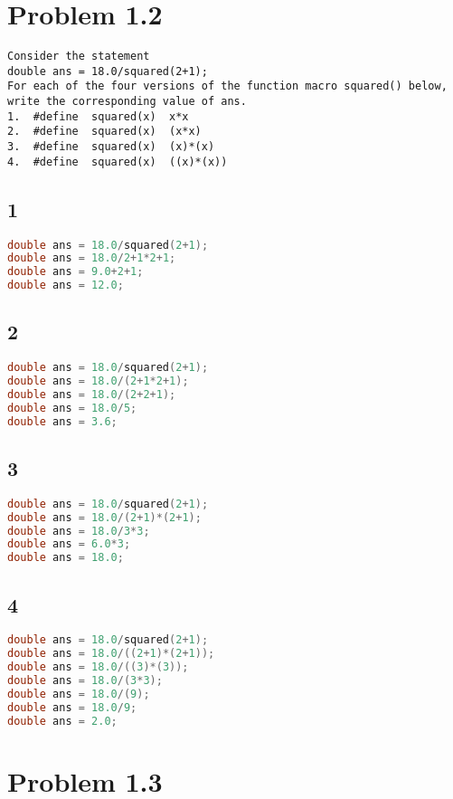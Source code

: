 \documentclass[12pt]{article}
\begin{document}
\section*{Problem 1.2}
\begin{verbatim}
Consider the statement
double ans = 18.0/squared(2+1);
For each of the four versions of the function macro squared() below, 
write the corresponding value of ans.
1.  #define  squared(x)  x*x
2.  #define  squared(x)  (x*x)
3.  #define  squared(x)  (x)*(x)
4.  #define  squared(x)  ((x)*(x))
\end{verbatim}

\subsection*{1}
\begin{lstlisting}[frame=single, language=C]
double ans = 18.0/squared(2+1);
double ans = 18.0/2+1*2+1;
double ans = 9.0+2+1;
double ans = 12.0;
\end{lstlisting}

\subsection*{2}
\begin{lstlisting}[frame=single, language=C]
double ans = 18.0/squared(2+1);
double ans = 18.0/(2+1*2+1);
double ans = 18.0/(2+2+1);
double ans = 18.0/5;
double ans = 3.6;
\end{lstlisting}

\subsection*{3}
\begin{lstlisting}[frame=single, language=C]
double ans = 18.0/squared(2+1);
double ans = 18.0/(2+1)*(2+1);
double ans = 18.0/3*3;
double ans = 6.0*3;
double ans = 18.0;
\end{lstlisting}

\subsection*{4}
\begin{lstlisting}[frame=single, language=C]
double ans = 18.0/squared(2+1);
double ans = 18.0/((2+1)*(2+1));
double ans = 18.0/((3)*(3));
double ans = 18.0/(3*3);
double ans = 18.0/(9);
double ans = 18.0/9;
double ans = 2.0;
\end{lstlisting}

\section*{Problem 1.3}
 
 
\end{document}
